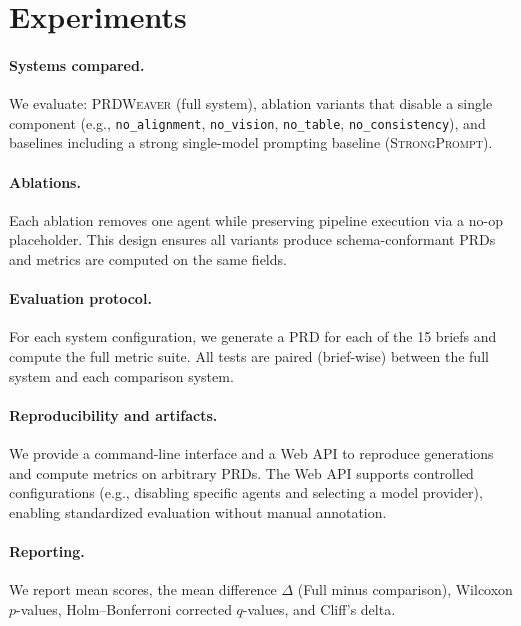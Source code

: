 \section{Experiments}
\label{sec:experiments}

\paragraph{Systems compared.}
We evaluate:
\textsc{PRDWeaver} (full system),
ablation variants that disable a single component (e.g., \texttt{no\_alignment}, \texttt{no\_vision}, \texttt{no\_table}, \texttt{no\_consistency}),
and baselines including a strong single-model prompting baseline (\textsc{StrongPrompt}).

\paragraph{Ablations.}
Each ablation removes one agent while preserving pipeline execution via a no-op placeholder.
This design ensures all variants produce schema-conformant PRDs and metrics are computed on the same fields.

\paragraph{Evaluation protocol.}
For each system configuration, we generate a PRD for each of the 15 briefs and compute the full metric suite.
All tests are paired (brief-wise) between the full system and each comparison system.

\paragraph{Reproducibility and artifacts.}
We provide a command-line interface and a Web API to reproduce generations and compute metrics on arbitrary PRDs.
The Web API supports controlled configurations (e.g., disabling specific agents and selecting a model provider), enabling standardized evaluation without manual annotation.

\paragraph{Reporting.}
We report mean scores, the mean difference \(\Delta\) (Full minus comparison), Wilcoxon \(p\)-values, Holm--Bonferroni corrected \(q\)-values, and Cliff's delta.


